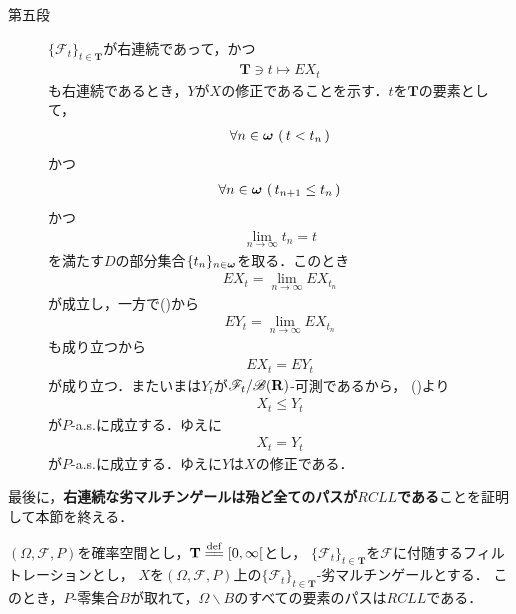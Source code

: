 \begin{sketch}
\begin{description}
			\item[第五段]
				$\{\mathscr{F}_t\}_{t \in \mathbf{T}}$が右連続であって，かつ
				\begin{align}
					\mathbf{T} \ni t \longmapsto EX_t
				\end{align}
				も右連続であるとき，$Y$が$X$の修正であることを示す．$t$を$\mathbf{T}$の要素として，
				\begin{align}
					\forall n \in {\boldsymbol \omega}\, \left(\, t < t_n\, \right)
				\end{align}
				かつ
				\begin{align}
					\forall n \in {\boldsymbol \omega}\, \left(\, t_{n+1} \leq t_n\, \right)
				\end{align}
				かつ
				\begin{align}
					\lim_{n \to \infty} t_n = t
				\end{align}
				を満たす$D$の部分集合$\{t_n\}_{n \in {\boldsymbol \omega}}$を取る．このとき
				\begin{align}
					EX_t = \lim_{n \to \infty} EX_{t_n}
				\end{align}
				が成立し，一方で()から
				\begin{align}
					EY_t = \lim_{n \to \infty} EX_{t_n}
				\end{align}
				も成り立つから
				\begin{align}
					EX_t = EY_t
				\end{align}
				が成り立つ．またいまは$Y_t$が$\mathscr{F}_t/\mathscr{B}(\mathbf{R})$-可測であるから，
				()より
				\begin{align}
					X_t \leq Y_t
				\end{align}
				が$P$-a.s.に成立する．ゆえに
				\begin{align}
					X_t = Y_t
				\end{align}
				が$P$-a.s.に成立する．ゆえに$Y$は$X$の修正である．
				\QED
		\end{description}
	\end{sketch}
	
	最後に，{\bf 右連続な劣マルチンゲールは殆ど全てのパスが$RCLL$である}ことを証明して本節を終える．
	
	\begin{screen}
		\begin{thm}[パスの正則性]
			$(\Omega,\mathscr{F},P)$を確率空間とし，$\mathbf{T} \defeq [0,\infty[$とし，
			$\{\mathscr{F}_t\}_{t \in \mathbf{T}}$を$\mathscr{F}$に付随するフィルトレーションとし，
			$X$を$(\Omega,\mathscr{F},P)$上の$\{\mathscr{F}_t\}_{t \in \mathbf{T}}$-劣マルチンゲールとする．
			このとき，$P$-零集合$B$が取れて，$\Omega \backslash B$のすべての要素のパスは$RCLL$である．
		\end{thm}
	\end{screen}